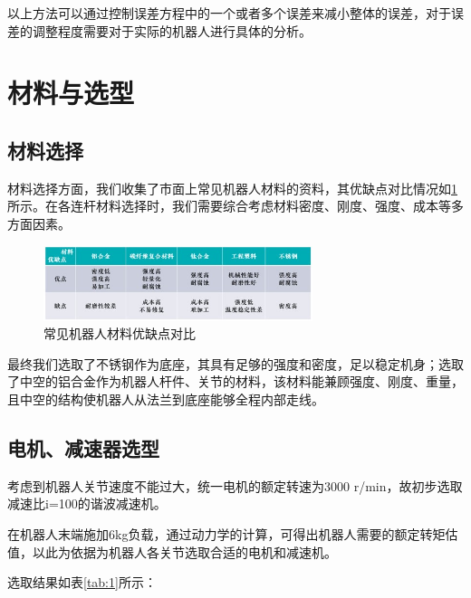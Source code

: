 以上方法可以通过控制误差方程中的一个或者多个误差来减小整体的误差，对于误差的调整程度需要对于实际的机器人进行具体的分析。

\section{材料与选型}
\subsection{材料选择}
材料选择方面，我们收集了市面上常见机器人材料的资料，其优缺点对比情况如\ref{fig:6}所示。在各连杆材料选择时，我们需要综合考虑材料密度、刚度、强度、成本等多方面因素。

\begin{figure}[h]
    \centering
    \includegraphics[width=0.7\textwidth]{Image/fig6.jpg}
    \caption{常见机器人材料优缺点对比}
    \label{fig:6}
\end{figure}

最终我们选取了不锈钢作为底座，其具有足够的强度和密度，足以稳定机身；选取了中空的铝合金作为机器人杆件、关节的材料，该材料能兼顾强度、刚度、重量，且中空的结构使机器人从法兰到底座能够全程内部走线。

\subsection{电机、减速器选型}
考虑到机器人关节速度不能过大，统一电机的额定转速为3000 r/min，故初步选取减速比i=100的谐波减速机。	

在机器人末端施加6kg负载，通过动力学的计算，可得出机器人需要的额定转矩估值，以此为依据为机器人各关节选取合适的电机和减速机。

选取结果如表\ref{tab:1}所示：

